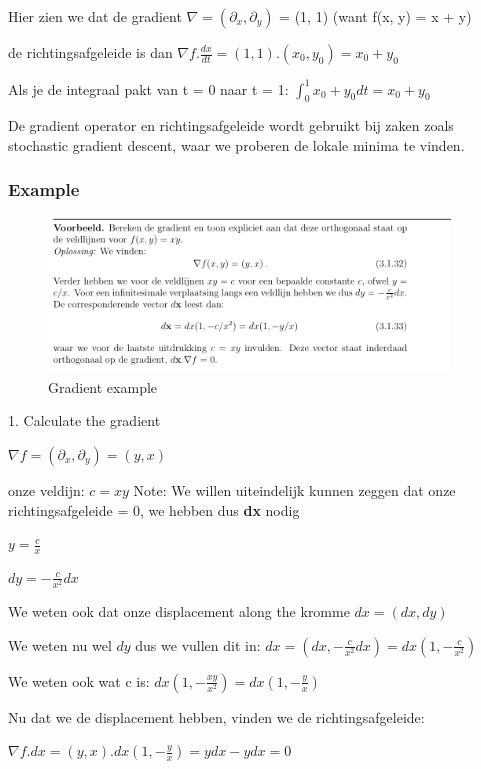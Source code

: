 \documentclass[a4paper]{article}
\begin{document}
Hier zien we dat de gradient $\nabla = (\partial_x, \partial_y)$ = (1, 1) (want f(x, y) = x + y)

de richtingsafgeleide is dan $\nabla f . \frac{dx}{dt} = (1, 1) . (x_0, y_0) = x_0 + y_0$

Als je de integraal pakt van t = 0 naar t = 1: $\int_0^1 x_0 + y_0 dt = x_0 + y_0$

De gradient operator en richtingsafgeleide wordt gebruikt bij zaken zoals stochastic gradient descent, waar we proberen de lokale minima te vinden.

\subsubsection{Example}
\begin{figure}[H]
	\begin{center}
		\includegraphics[width=0.95\textwidth]{./images/gradient_2.png}
	\end{center}
	\caption{Gradient example}
	\label{}
\end{figure}

1. Calculate the gradient

$\nabla f = (\partial_x, \partial_y) = (y, x)$

onze veldijn: $c = xy$
Note: We willen uiteindelijk kunnen zeggen dat onze richtingsafgeleide = 0, we hebben dus \textbf{dx} nodig

$y = \frac{c}{x}$

$dy = - \frac{c}{x^2} dx$

We weten ook dat onze displacement along the kromme $dx = (dx, dy)$

We weten nu wel $dy$ dus we vullen dit in: $dx = (dx, - \frac{c}{x^2} dx) = dx(1, - \frac{c}{x^2})$

We weten ook wat c is: $dx(1, - \frac{xy}{x^2}) = dx(1, - \frac{y}{x})$

Nu dat we de displacement hebben, vinden we de richtingsafgeleide:

$\nabla f . dx = (y, x) . dx(1, - \frac{y}{x}) = ydx - ydx = 0$
\end{document}
